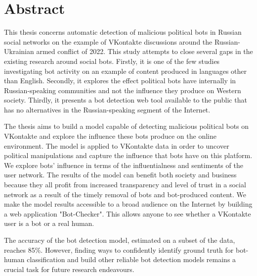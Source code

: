 \chapter*{Abstract}
This thesis concerns automatic detection of malicious political bots in Russian social networks on the example of VKontakte discussions around the Russian-Ukrainian armed conflict of 2022. This study attempts to close several gaps in the existing research around social bots. Firstly, it is one of the few studies investigating bot activity on an example of content produced in languages other than English. Secondly, it explores the effect political bots have internally in Russian-speaking communities and not the influence they produce on Western society. Thirdly, it presents a bot detection web tool available to the public that has no alternatives in the Russian-speaking segment of the Internet. 

The thesis aims to build a model capable of detecting malicious political bots on VKontakte and explore the influence these bots produce on the online environment. The model is applied to VKontakte data in order to uncover political manipulations and capture the influence that bots have on this platform. We explore bots' influence in terms of the influentialness and sentiments of the user network. The results of the model can benefit both society and business because they all profit from increased transparency and level of trust in a social network as a result of the timely removal of bots and bot-produced content.  We make the model results accessible to a broad audience on the Internet by building a web application "Bot-Checker". This allows anyone to see whether a VKontakte user is a bot or a real human. 

The accuracy of the bot detection model, estimated on a subset of the data, reaches 85\%. However, finding ways to confidently identify ground truth for bot-human classification and build other reliable bot detection models remains a crucial task for future research endeavours.
